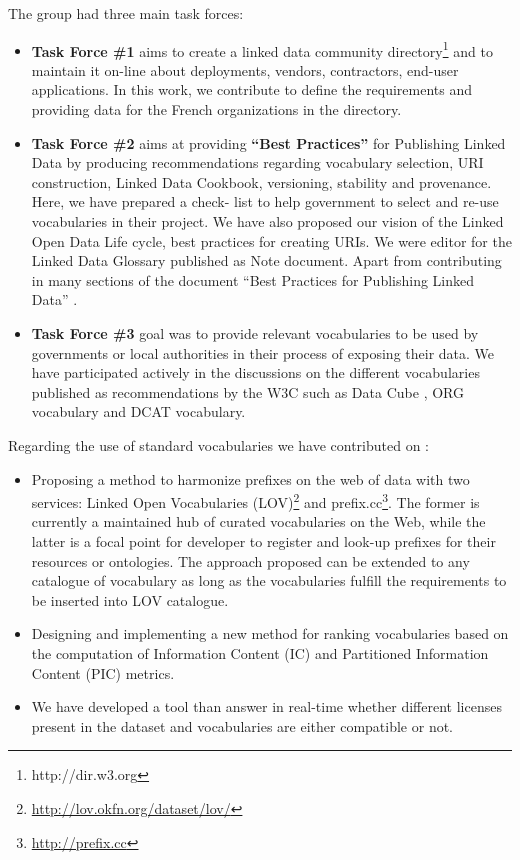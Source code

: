 The group had three main task forces:
\begin{itemize}
\item \textbf{Task Force \#1} aims to create a linked data community directory\footnote{http://dir.w3.org} and to maintain it on-line about deployments, vendors, contractors, end-user applications. In this work, we contribute to define the requirements and providing data for the French organizations in the directory.

\item \textbf{Task Force \#2} aims at providing \textbf{``Best Practices''} for Publishing Linked Data by producing recommendations regarding vocabulary selection, URI construction, Linked Data Cookbook, versioning, stability and provenance. Here, we have prepared a check- list to help government to select and re-use vocabularies in their project. We have also proposed our vision of the Linked Open Data Life cycle, best practices for creating URIs. We were editor for the Linked Data Glossary \cite{glossairegld} published as Note document. Apart from contributing in many sections of the document ``Best Practices for Publishing Linked Data'' \cite{bpgld}.

\item \textbf{Task Force \#3} goal was to provide relevant vocabularies to be used by governments or local authorities in their process of exposing their data. We have participated actively in the discussions on the different vocabularies published as recommendations by the W3C such as Data Cube \cite{dcube}, ORG vocabulary \cite{org} and DCAT \cite{dcat} vocabulary.
\end{itemize}

Regarding the use of standard vocabularies we have contributed on : 
\begin{itemize}

\item  Proposing a method to harmonize prefixes on the web of data  with two services: Linked Open Vocabularies (LOV)\footnote{\url{http://lov.okfn.org/dataset/lov/}} and prefix.cc\footnote{\url{http://prefix.cc}}. The former is currently a maintained hub of curated vocabularies on the Web, while the latter is a focal point for developer to register and look-up prefixes for their resources or ontologies. The approach proposed can be extended to any catalogue of vocabulary as long as the vocabularies fulfill the requirements to be inserted into LOV catalogue. 

\item  Designing and implementing a new method for ranking vocabularies based on the computation of Information Content (IC) and Partitioned Information Content (PIC) metrics.

\item We have developed a tool than answer in real-time whether different licenses present in the dataset and vocabularies are either compatible or not. 
\end{itemize}

